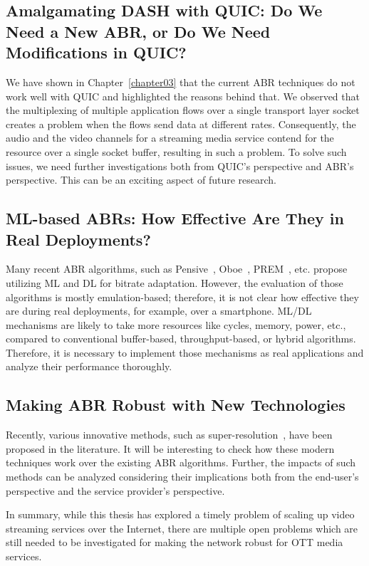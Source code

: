 \subsection{Amalgamating DASH with QUIC: Do We Need a New ABR, or Do We Need Modifications in QUIC?}
We have shown in Chapter~\ref{chapter03} that the current \ac{ABR} techniques do not work well with \ac{QUIC} and highlighted the reasons behind that. We observed that the multiplexing of multiple application flows over a single transport layer socket creates a problem when the flows send data at different rates. Consequently, the audio and the video channels for a streaming media service contend for the resource over a single socket buffer, resulting in such a problem. To solve such issues, we need further investigations both from \ac{QUIC}'s perspective and \ac{ABR}'s perspective. This can be an exciting aspect of future research. 

\subsection{ML-based ABRs: How Effective Are They in Real Deployments?}
Many recent ABR algorithms, such as Pensive~\cite{mao2017neural}, Oboe~\cite{Akhtar2018}, PREM~\cite{9155492}, etc. propose utilizing ML and DL for bitrate adaptation. However, the evaluation of those algorithms is mostly emulation-based; therefore, it is not clear how effective they are during real deployments, for example, over a smartphone. ML/DL mechanisms are likely to take more resources like  cycles, memory, power, etc., compared to conventional buffer-based, throughput-based, or hybrid algorithms. Therefore, it is necessary to implement those mechanisms as real applications and analyze their performance thoroughly.   

\subsection{Making ABR Robust with New Technologies}
Recently, various innovative methods, such as super-resolution~\cite{9155384}, have been proposed in the literature. It will be interesting to check how these modern techniques work over the existing ABR algorithms. Further, the impacts of such methods can be analyzed considering their implications both from the end-user's perspective and the service provider's perspective. 


In summary, while this thesis has explored a timely problem of scaling up video streaming services over the Internet, there are multiple open problems which are still needed to be investigated for making the network robust for \ac{OTT} media services. 